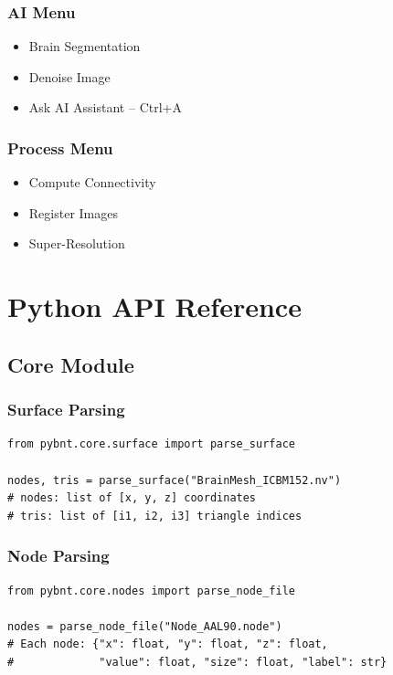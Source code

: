 \documentclass[11pt,a4paper]{article}
\begin{document}
\subsubsection{AI Menu}
\begin{itemize}
    \item Brain Segmentation
    \item Denoise Image
    \item Ask AI Assistant -- Ctrl+A
\end{itemize}

\subsubsection{Process Menu}
\begin{itemize}
    \item Compute Connectivity
    \item Register Images
    \item Super-Resolution
\end{itemize}

\section{Python API Reference}

\subsection{Core Module}

\subsubsection{Surface Parsing}

\begin{lstlisting}[caption=pybnt.core.surface]
from pybnt.core.surface import parse_surface

nodes, tris = parse_surface("BrainMesh_ICBM152.nv")
# nodes: list of [x, y, z] coordinates
# tris: list of [i1, i2, i3] triangle indices
\end{lstlisting}

\subsubsection{Node Parsing}

\begin{lstlisting}[caption=pybnt.core.nodes]
from pybnt.core.nodes import parse_node_file

nodes = parse_node_file("Node_AAL90.node")
# Each node: {"x": float, "y": float, "z": float,
#             "value": float, "size": float, "label": str}
\end{lstlisting}
\end{document}
